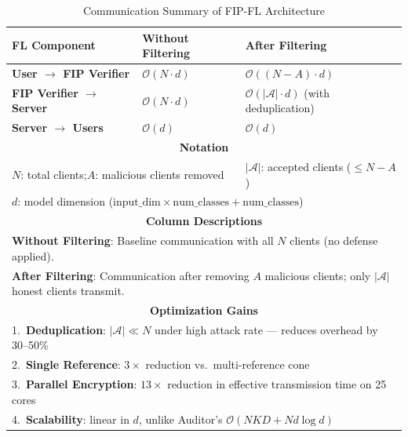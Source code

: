 \documentclass[10pt,journal,compsoc]{IEEEtran}
\begin{document}
\begin{table}[htbp]
\caption{Communication Summary of FIP-FL Architecture}
\label{tab:communication}
\centering
\renewcommand{\arraystretch}{1.4}
\begin{tabular}{|l|l|l|}
\hline
\textbf{FL Component} & \textbf{Without Filtering} & \textbf{After Filtering} \\
\hline
\textbf{User $\rightarrow$ FIP Verifier}
  & $\mathcal{O}(N \cdot d)$
  & $\mathcal{O}((N-A) \cdot d)$ \\
\hline
\textbf{FIP Verifier $\rightarrow$ Server}
  & $\mathcal{O}(N \cdot d)$
  & $\mathcal{O}(|\mathcal{A}| \cdot d)$ (with deduplication) \\
\hline
\textbf{Server $\rightarrow$ Users}
  & $\mathcal{O}(d)$
  & $\mathcal{O}(d)$ \\
\hline
\multicolumn{3}{|c|}{\textbf{Notation}} \\
\hline
\multicolumn{2}{|l|}{$N$: total clients;\quad $A$: malicious clients removed}
  & \multicolumn{1}{l|}{$|\mathcal{A}|$: accepted clients ($\leq N{-}A$)} \\
\hline
\multicolumn{3}{|l|}{$d$: model dimension
  ($\text{input\_dim} \times \text{num\_classes} + \text{num\_classes}$)} \\
\hline
\multicolumn{3}{|c|}{\textbf{Column Descriptions}} \\
\hline
\multicolumn{3}{|l|}{\textbf{Without Filtering}: Baseline communication with all
  $N$ clients (no defense applied).} \\
\multicolumn{3}{|l|}{\textbf{After Filtering}: Communication after removing $A$
  malicious clients; only $|\mathcal{A}|$ honest clients transmit.} \\
\hline
\multicolumn{3}{|c|}{\textbf{Optimization Gains}} \\
\hline
\multicolumn{3}{|l|}{1.~\textbf{Deduplication}: $|\mathcal{A}| \ll N$ under high
  attack rate --- reduces overhead by 30--50\%} \\
\multicolumn{3}{|l|}{2.~\textbf{Single Reference}: $3\times$ reduction vs.\
  multi-reference cone} \\
\multicolumn{3}{|l|}{3.~\textbf{Parallel Encryption}: $13\times$ reduction in
  effective transmission time on 25 cores} \\
\multicolumn{3}{|l|}{4.~\textbf{Scalability}: linear in $d$, unlike Auditor's
  $\mathcal{O}(NKD + Nd\log d)$} \\
\hline
\end{tabular}
\end{table}
\end{document}
